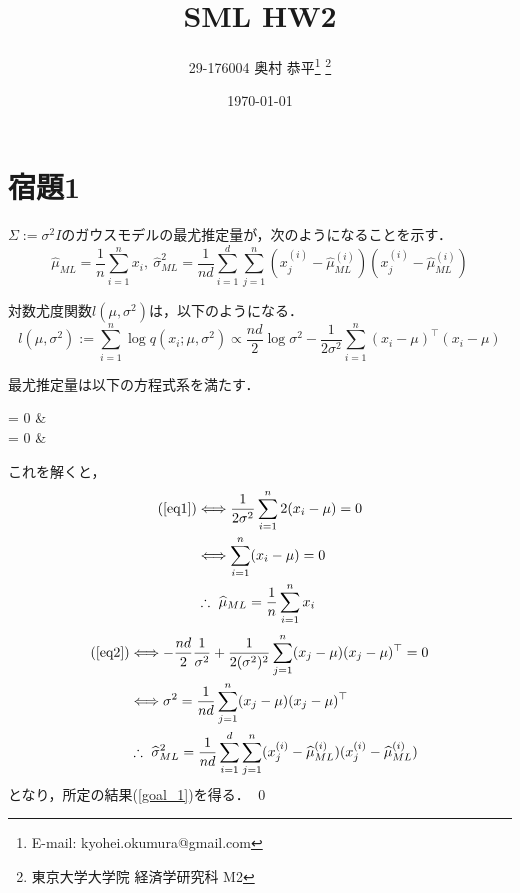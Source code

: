 \documentclass[11pt,a4paper,dvipdfmx]{article}
\theoremstyle{plain}
\renewcommand{\hat}{\widehat}
\newcommand{\equi}{\Longleftrightarrow}
\newcommand{\1}{\mbox{1}\hspace{-0.25em}\mbox{l}}
\begin{document}
\title{SML HW2}
\author{29-176004 奥村 恭平{\footnote{E-mail: kyohei.okumura@gmail.com}
\footnote{東京大学大学院 経済学研究科 M2}
}}
\date{\today}
\maketitle


\section*{宿題1}
$\Sigma := \sigma^2 I$のガウスモデルの最尤推定量が，次のようになることを示す．
\begin{equation} \label{goal_1}
	\hat{\mu}_{ML} = \frac{1}{n}\sum_{i=1}^n x_i, \ 
	\hat{\sigma}^2_{ML} = \frac{1}{nd} \sum_{i=1}^d \sum_{j=1}^n (x_j^{(i)} - \hat{\mu}^{(i)}_{ML})(x_j^{(i)} - \hat{\mu}^{(i)}_{ML})
\end{equation}

対数尤度関数$l(\mu, \sigma^2)$は，以下のようになる．
$$
l(\mu, \sigma^2) := \sum_{i=1}^n \log q(x_i; \mu, \sigma^2) \propto \frac{nd}{2} \log \sigma^2 - \frac{1}{2 \sigma^2} \sum_{i=1}^n (x_i - \mu)^\top (x_i - \mu)
$$

最尤推定量は以下の方程式系を満たす．
\begin{numcases}
	{}
	 = 0 & \label{eq1}\\ 
	 = 0 \label{eq2}& 
\end{numcases}
これを解くと，
\begin{align*}
	(\ref{eq1})
	&\equi \frac{1}{2 \sigma^2}\sum_{i=1}^n 2(x_i - \mu) = 0 \\
	&\equi \sum_{i=1}^n (x_i - \mu) = 0 \\
	&\therefore \ \hat{\mu}_{ML} = \frac{1}{n}\sum_{i=1}^n x_i
\end{align*}
\begin{align*}
	(\ref{eq2}) &\equi - \frac{nd}{2} \frac{1}{\sigma^2} + \frac{1}{2(\sigma^2)^2} \sum_{j=1}^n (x_j - \mu)(x_j - \mu)^\top  = 0 \\
	&\equi \sigma^2 = \frac{1}{nd}\sum_{j=1}^n (x_j - \mu)(x_j - \mu)^\top \\
	&\therefore \ 
	\hat{\sigma}^2_{ML} = \frac{1}{nd} \sum_{i=1}^d \sum_{j=1}^n (x_j^{(i)} - \hat{\mu}^{(i)}_{ML})(x_j^{(i)} - \hat{\mu}^{(i)}_{ML})
\end{align*}
となり，所定の結果(\ref{goal_1})を得る．
\qed
\end{document}
